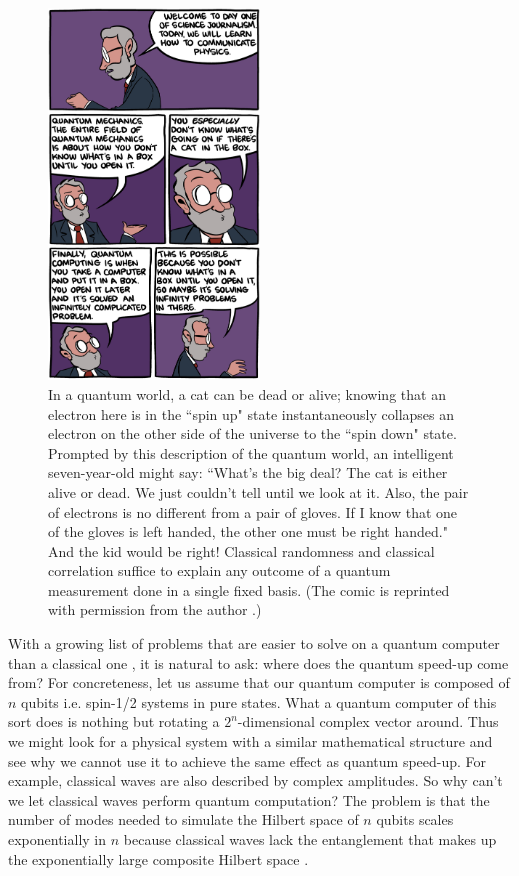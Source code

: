 \begin{figure}[H]
	\begin{center}
		\includegraphics[width=0.5\textwidth]{img/smbc-science-communication.png}
			\caption{In a quantum world, a cat can be dead or alive; knowing that an electron here is in the ``spin up" state instantaneously collapses an electron on the other side of the universe to the ``spin down" state.
			Prompted by this description of the quantum world, an intelligent seven-year-old might say: ``What's the big deal? The cat is either alive or dead. We just couldn't tell until we look at it. Also, the pair of electrons is no different from a pair of gloves. If I know that one of the gloves is left handed, the other one must be right handed."
			And the kid would be right! Classical randomness and classical correlation suffice to explain any outcome of a quantum measurement done in a single fixed basis.
			(The comic is reprinted with permission from the author \cite{SMBC}.)}
			\label{fig:smbc-comics}
	\end{center}
\end{figure}

With a growing list of problems that are easier to solve on a quantum computer than a classical one \cite{jordan2017zoo}, it is natural to ask: where does the quantum speed-up come from?  For concreteness, let us assume that our quantum computer is composed of $n$ qubits i.e. spin-1/2 systems in pure states.  What a quantum computer of this sort does is nothing but rotating a $2^n$-dimensional complex vector around.  Thus we might look for a physical system with a similar mathematical structure and see why we cannot use it to achieve the same effect as quantum speed-up. For example, classical waves are also described by complex amplitudes. So why can't we let classical waves perform quantum computation? The problem is that the number of modes needed to simulate the Hilbert space of $n$ qubits scales exponentially in $n$ because classical waves lack the entanglement that makes up the exponentially large composite Hilbert space \cite{jozsa1997entanglement,blume-kohout_climbing_2002}.

